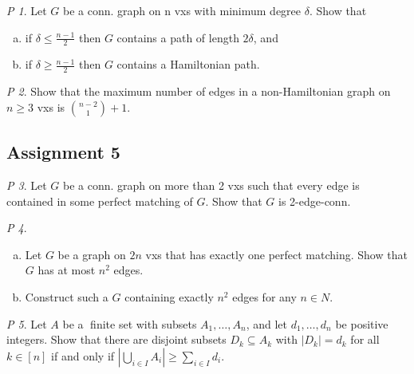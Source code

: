 \documentclass[11pt, fleqn, a4paper, landscape]{article}
\theoremstyle{plain} %
\theoremstyle{remark} %
\newtheorem{problem}{P}
\theoremstyle{definition} %
\begin{document}
\begin{multicols}{5}
\begin{problem}
Let $G$ be a conn. graph on n vxs with minimum degree $\delta$. Show that 
\begin{enumerate}[(a)]
\item if $\delta \le \frac{n-1}{2}$ then $G$ contains a path of length $2\delta$, and
\item if $\delta \ge \frac{n-1}{2}$ then $G$ contains a Hamiltonian path.
\end{enumerate}
\end{problem}

\begin{problem}
Show that the maximum number of edges in a non-Hamiltonian graph on $n \ge 3$
vxs is $\binom{n-2}{1}+1$.
\end{problem}

\subsection{Assignment 5}

\begin{problem}
Let $G$ be a conn. graph on more than 2 vxs such that every edge is
contained in some perfect matching of $G$. Show that $G$ is 2-edge-conn.
\end{problem}

\begin{problem}
\begin{enumerate}[(a)]
\item Let $G$ be a graph on $2n$ vxs that has exactly one perfect matching. Show that $G$ has at most $n^2$ edges.
\item Construct such a $G$ containing exactly $n^2$ edges for any $n \in N$.
\end{enumerate}
\end{problem}

\begin{problem}
Let $A$ be a finite set with subsets $A_1,\dots, A_n$, and let $d_1,\dots, d_n$ be positive integers. Show that there are disjoint subsets $D_k \subseteq A_k$ with $|D_k| = d_k$ for all $k \in [n]$ if and
only if $|\bigcup_{i\in I}A_i|\ge \sum_{i\in I}d_i$.
\end{problem}


\end{multicols}
\end{document}
